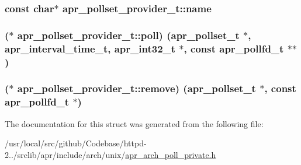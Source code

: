 \subsubsection[{\texorpdfstring{name}{name}}]{\setlength{\rightskip}{0pt plus 5cm}const char$\ast$ apr\+\_\+pollset\+\_\+provider\+\_\+t\+::name}\hypertarget{structapr__pollset__provider__t_a6413a1fb95329ef6250f2c3350fadc87}{}\label{structapr__pollset__provider__t_a6413a1fb95329ef6250f2c3350fadc87}
\subsubsection[{\texorpdfstring{poll}{poll}}]{($\ast$ apr\+\_\+pollset\+\_\+provider\+\_\+t\+::poll) ({\bf apr\+\_\+pollset\+\_\+t} $\ast$, {\bf apr\+\_\+interval\+\_\+time\+\_\+t}, {\bf apr\+\_\+int32\+\_\+t} $\ast$, const {\bf apr\+\_\+pollfd\+\_\+t} $\ast$$\ast$)}\hypertarget{structapr__pollset__provider__t_a3b27b07f7ec4170af1e8d2206c759fd9}{}\label{structapr__pollset__provider__t_a3b27b07f7ec4170af1e8d2206c759fd9}
\subsubsection[{\texorpdfstring{remove}{remove}}]{($\ast$ apr\+\_\+pollset\+\_\+provider\+\_\+t\+::remove) ({\bf apr\+\_\+pollset\+\_\+t} $\ast$, const {\bf apr\+\_\+pollfd\+\_\+t} $\ast$)}\hypertarget{structapr__pollset__provider__t_abe81d05aa0123864fff065052ab57ac6}{}\label{structapr__pollset__provider__t_abe81d05aa0123864fff065052ab57ac6}


The documentation for this struct was generated from the following file\+:\begin{DoxyCompactItemize}
\item 
/usr/local/src/github/\+Codebase/httpd-\/2../srclib/apr/include/arch/unix/\hyperlink{apr__arch__poll__private_8h}{apr\+\_\+arch\+\_\+poll\+\_\+private.\+h}\end{DoxyCompactItemize}
